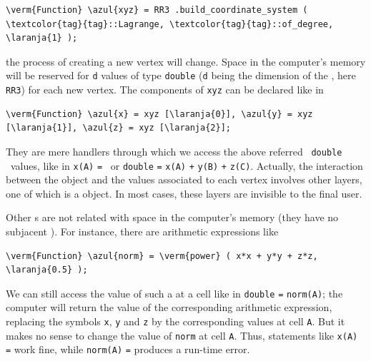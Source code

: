 \begin{Verbatim}[commandchars=\\\{\},formatcom=\small\tt,baselinestretch=0.94]
   \verm{Function} \azul{xyz} = RR3 .build_coordinate_system ( \textcolor{tag}{tag}::Lagrange, \textcolor{tag}{tag}::of_degree, \laranja{1} );
\end{Verbatim}

\noindent the process of creating a new vertex will change.
Space in the computer's memory will be reserved for {\small\tt d} values of type
{\small\tt double} ({\small\tt d} being the dimension of the {\small\tt{}},
here {\small\tt RR3}) for each new vertex.
The components of {\small\tt xyz} can be declared like in

\begin{Verbatim}[commandchars=\\\{\},formatcom=\small\tt,baselinestretch=0.94]
   \verm{Function} \azul{x} = xyz [\laranja{0}], \azul{y} = xyz [\laranja{1}], \azul{z} = xyz [\laranja{2}];
\end{Verbatim}

\noindent They are mere handlers through which we access the above referred \ {\small\tt double}
\ values, like in {\small\tt x(A)} {\small\tt =} {\small\tt {}}\ or
{\small\tt double} {\small\tt {}} {\small\tt =} {\small\tt x(A)} {\small\tt +}
{\small\tt y(B)} {\small\tt +} {\small\tt z(C)}.
Actually, the interaction between the {\small\tt{}} object and the values
associated to each vertex involves other layers, one of which is a {\small\tt{}}
object.
In most cases, these layers are invisible to the final user.

Other {\small\tt{}}s are not related with space in the computer's memory
(they have no subjacent {\small\tt{}}).
For instance, there are arithmetic expressions like 

\begin{Verbatim}[commandchars=\\\{\},formatcom=\small\tt,baselinestretch=0.94]
   \verm{Function} \azul{norm} = \verm{power} ( x*x + y*y + z*z, \laranja{0.5} );
\end{Verbatim}

We can still access the value of such a {\small\tt {}} at a cell like in
{\small\tt double} {\small\tt {}} {\small\tt =} {\small\tt norm(A)};
the computer will return the value of the corresponding arithmetic expression,
replacing the symbols {\small\tt x}, {\small\tt y} and {\small\tt z} by the corresponding
values at cell {\small\tt A}.
But it makes no sense to change the value of {\small\tt norm} at cell {\small\tt A}.
Thus, statements like {\small\tt x(A)} {\small\tt =} {\small\tt {}} work fine,
while {\small\tt norm(A)} {\small\tt =} {\small\tt {}} produces a run-time error.

